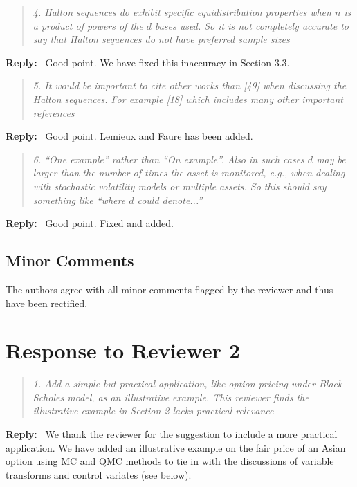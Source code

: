 \documentclass[11pt]{article}
\newenvironment{response}{%
  \vspace{1em}
  \begin{quote}\itshape
}{%
  \end{quote}
  \noindent\textbf{Reply:}~
}
\begin{document}
\begin{response}{4.}
Halton sequences do exhibit specific equidistribution properties when $n$ is a product of powers of the $d$ bases used. So it is not completely accurate to say that Halton sequences do not have preferred sample sizes
\end{response}
Good point. We have fixed this inaccuracy in Section 3.3.



\begin{response}{5.}
    It would be important to cite other works than [49] when discussing the Halton sequences. For example [18] which includes many other important references
\end{response}
Good point. Lemieux and Faure has been added.


\begin{response}{6.}
“One example” rather than “On example”. Also in such cases $d$ may be larger than the number of times the asset is monitored, e.g., when dealing with stochastic volatility models or multiple assets. So this should say something like “where $d$ could denote...”
\end{response}
Good point. Fixed and added.


\subsection*{Minor Comments}

The authors agree with all minor comments  flagged by the reviewer and thus have been rectified.



\newpage

\section*{Response to Reviewer 2}


\begin{response}{1.}
    Add a simple but practical application, like option pricing under Black-Scholes model, as an illustrative example. This reviewer finds the illustrative example in Section 2 lacks practical relevance
\end{response}
We thank the reviewer for the suggestion to include a more practical application. We have added an illustrative example on the fair price of an Asian option using MC and QMC methods to tie in with the discussions of variable transforms and control variates (see below).
\end{document}
